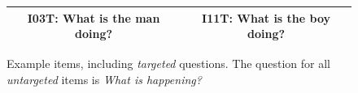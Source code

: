 \documentclass[12pt]{article}
\begin{document}
\begin{figure}[h]
\begin{center}
\begin{tabular}{|c|c|}
\hline
I03T: What is the man doing? & I11T: What is the boy doing? \\
\hline
\end{tabular}
\end{center}
\caption{Example items, including \textit{targeted} questions. The question for all \textit{untargeted} items is \textit{What is happening?}}
\label{fig:appendix1}
\end{figure}

\clearpage 



\end{document}
